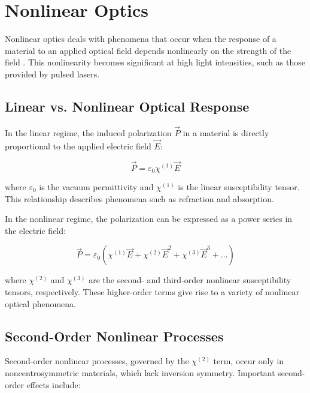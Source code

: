 \section{Nonlinear Optics}
\label{sec:nonlinear_optics}

\noindent Nonlinear optics deals with phenomena that occur when the response of a material to an applied optical field depends nonlinearly on the strength of the field \cite{boyd2008contents}. This nonlinearity becomes significant at high light intensities, such as those provided by pulsed lasers.

\subsection{Linear vs. Nonlinear Optical Response}
\label{subsec:linear_vs_nonlinear}

\noindent In the linear regime, the induced polarization $\vec{P}$ in a material is directly proportional to the applied electric field $\vec{E}$:

\begin{equation}
	\vec{P} = \varepsilon_0 \chi^{(1)} \vec{E}
	\label{eq:linear_polarization}
\end{equation}

\noindent where $\varepsilon_0$ is the vacuum permittivity and $\chi^{(1)}$ is the linear susceptibility tensor. This relationship describes phenomena such as refraction and absorption.

\noindent In the nonlinear regime, the polarization can be expressed as a power series in the electric field:

\begin{equation}
	\vec{P} = \varepsilon_0 (\chi^{(1)} \vec{E} + \chi^{(2)} \vec{E}^2 + \chi^{(3)} \vec{E}^3 + \ldots)
	\label{eq:nonlinear_polarization}
\end{equation}

\noindent where $\chi^{(2)}$ and $\chi^{(3)}$ are the second- and third-order nonlinear susceptibility tensors, respectively. These higher-order terms give rise to a variety of nonlinear optical phenomena.

\subsection{Second-Order Nonlinear Processes}
\label{subsec:second_order}

\noindent Second-order nonlinear processes, governed by the $\chi^{(2)}$ term, occur only in noncentrosymmetric materials, which lack inversion symmetry. Important second-order effects include:

